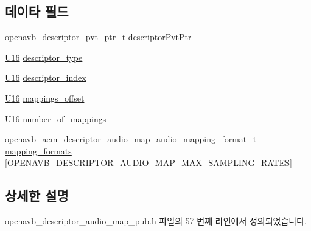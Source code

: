 \subsection*{데이타 필드}
\begin{DoxyCompactItemize}
\item 
\hyperlink{openavb__aem__pub_8h_a85eabab4b7d2466e94c1c3b43b11371d}{openavb\+\_\+descriptor\+\_\+pvt\+\_\+ptr\+\_\+t} \hyperlink{structopenavb__aem__descriptor__audio__map__t_a302e92fd6cf4d398d5305395359fb157}{descriptor\+Pvt\+Ptr}
\item 
\hyperlink{openavb__types__base__pub_8h_a0a0a322d5fa4a546d293a77ba8b4a71f}{U16} \hyperlink{structopenavb__aem__descriptor__audio__map__t_a1e231d7874aada5925b29affc76782cc}{descriptor\+\_\+type}
\item 
\hyperlink{openavb__types__base__pub_8h_a0a0a322d5fa4a546d293a77ba8b4a71f}{U16} \hyperlink{structopenavb__aem__descriptor__audio__map__t_ab26fb363c24b9a2a4391f9171c981b08}{descriptor\+\_\+index}
\item 
\hyperlink{openavb__types__base__pub_8h_a0a0a322d5fa4a546d293a77ba8b4a71f}{U16} \hyperlink{structopenavb__aem__descriptor__audio__map__t_a26d7a1810beb00d4c08e405a5e4fbe65}{mappings\+\_\+offset}
\item 
\hyperlink{openavb__types__base__pub_8h_a0a0a322d5fa4a546d293a77ba8b4a71f}{U16} \hyperlink{structopenavb__aem__descriptor__audio__map__t_a26fd9d15c04581b52ba90aed9c4149c9}{number\+\_\+of\+\_\+mappings}
\item 
\hyperlink{structopenavb__aem__descriptor__audio__map__audio__mapping__format__t}{openavb\+\_\+aem\+\_\+descriptor\+\_\+audio\+\_\+map\+\_\+audio\+\_\+mapping\+\_\+format\+\_\+t} \hyperlink{structopenavb__aem__descriptor__audio__map__t_ac90ae9387bd6bf3da136ae99a24b4d2d}{mapping\+\_\+formats} \mbox{[}\hyperlink{openavb__descriptor__audio__map__pub_8h_a411e733f30ddb828eedd1e54e2bb03ef}{O\+P\+E\+N\+A\+V\+B\+\_\+\+D\+E\+S\+C\+R\+I\+P\+T\+O\+R\+\_\+\+A\+U\+D\+I\+O\+\_\+\+M\+A\+P\+\_\+\+M\+A\+X\+\_\+\+S\+A\+M\+P\+L\+I\+N\+G\+\_\+\+R\+A\+T\+ES}\mbox{]}
\end{DoxyCompactItemize}


\subsection{상세한 설명}


openavb\+\_\+descriptor\+\_\+audio\+\_\+map\+\_\+pub.\+h 파일의 57 번째 라인에서 정의되었습니다.



